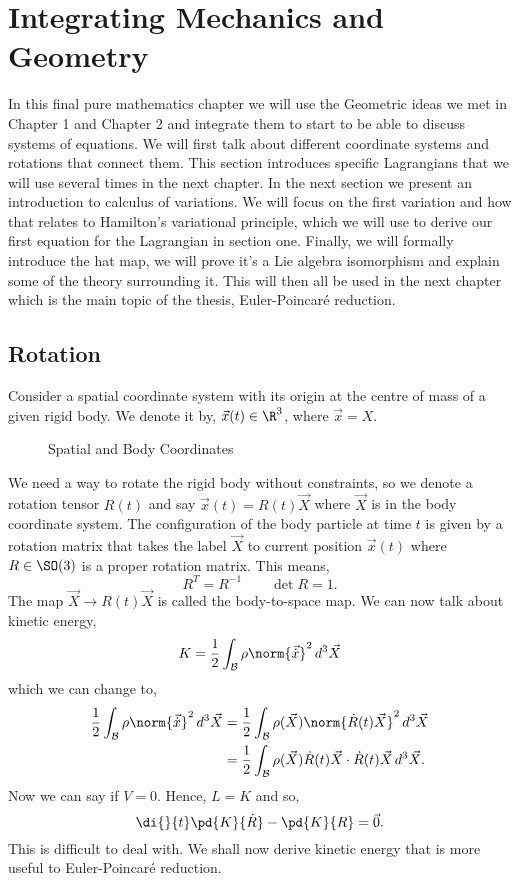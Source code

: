 
\section{Integrating Mechanics and Geometry}
In this final pure mathematics chapter we will use the Geometric ideas we met in Chapter 1 and Chapter 2 and integrate them to start to be able to discuss systems of equations. We will first talk about different coordinate systems and rotations that connect them. This section introduces specific Lagrangians that we will use several times in the next chapter. In the next section we present an introduction to calculus of variations. We will focus on the first variation and how that relates to Hamilton's variational principle, which we will use to derive our first equation for the Lagrangian in section one. Finally, we will formally introduce the hat map, we will prove it's a Lie algebra isomorphism and explain some of the theory surrounding it. This will then all be used in the next chapter which is the main topic of the thesis, Euler-Poincar\'e reduction.

\subsection{Rotation}
Consider a spatial coordinate system with its origin at the centre of mass of a given rigid body. We denote it by, $\vec{x}(t) \in \R^3$, where $\vec x = X$.
\begin{figure}[!ht]
\centering
\resizebox{0.2\textwidth}{!}{}
\caption{Spatial and Body Coordinates}
\end{figure}
We need a way to rotate the rigid body without constraints, so we denote a rotation tensor $R(t)$ and say $\vec x(t) = R(t)\vec X$ where $\vec X$ is in the body coordinate system. The configuration of the body particle at time $t$ is given by a rotation matrix that takes the label $\vec X$ to current position $\vec x(t)$ where $R \in \SO(3)$ is a proper rotation matrix. This means,
$$ R^T = R^{-1} \qquad \det R = 1. $$
The map $\vec X \to R(t)\vec X$ is called the body-to-space map. We can now talk about kinetic energy,
$$ K = \frac{1}{2}\int_\mathcal{B} \rho \norm{\vec{\dot x}}^2\, d^3\vec X$$
which we can change to,
\begin{align*}
  \frac{1}{2}\int_\mathcal{B} \rho \norm{\vec {\dot x}}^2\, d^3\vec X &= \frac{1}{2}\int_\mathcal{B} \rho(\vec X)\norm{\dot R(t)\vec X}^2 \,d^3\vec X\\
  &= \frac{1}{2}\int_\mathcal{B} \rho(\vec X)\dot R(t)\vec X \cdot \dot R(t)\vec X \,d^3\vec X.
\end{align*}
Now we can say if $V = 0$. Hence, $L = K$ and so,
$$ \di{}{t}\pd{K}{\dot R} - \pd{K}{R} = \vec 0. $$
This is difficult to deal with. We shall now derive kinetic energy that is more useful to Euler-Poincar\'e reduction. \\

